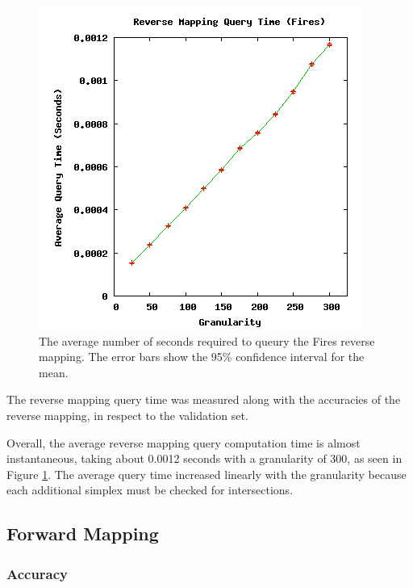 \begin{figure}[ht]
\centering
\includegraphics[scale=.5]{images/results_fires/rmquery.png}
\caption{The average number of seconds required to queury the Fires reverse mapping.
The error bars show the 95\% confidence interval for the mean.}
\label{fig:rmquery}
\end{figure}

The reverse mapping query time was measured along with the accuracies of the reverse mapping, in respect to the validation set.

Overall, the average reverse mapping query computation time is almost instantaneous, taking about 0.0012 seconds with a granularity of 300, as seen in Figure \ref{fig:rmquery}.
The average query time increased linearly with the granularity because each additional simplex must be checked for intersections.


 \subsection{Forward Mapping}

  \subsubsection{Accuracy}

